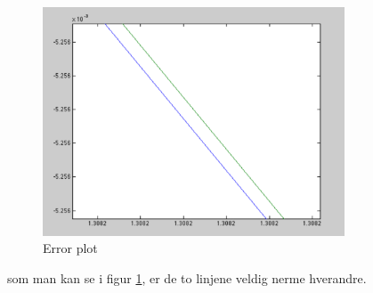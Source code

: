 \begin{figure}[h]
    \centering
    \includegraphics[width=0.8\textwidth]{sections/Exercise2/errorplot2}
    \caption{Error plot}
    \label{fig:errorplot2}
\end{figure}
 
som man kan se i figur \ref{fig:errorplot2}, er de to linjene veldig nerme hverandre.


% 